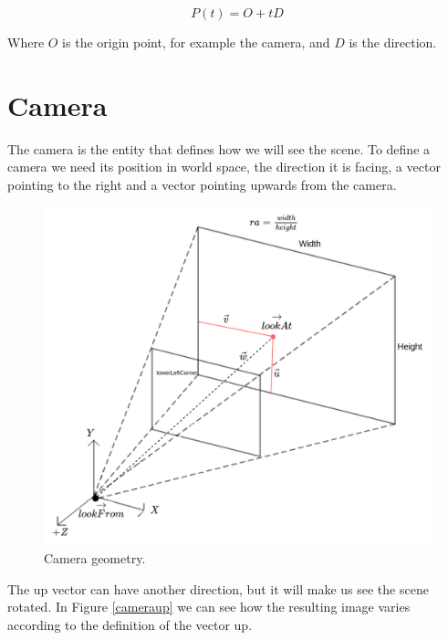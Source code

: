 \documentclass[titlepage,12pt]{report}
\begin{document}
\begin{equation} \label{rayeq}
P(t) = O + tD
\end{equation}

Where $O$ is the origin point, for example the camera, and $D$ is the direction.

\section{Camera}

The camera is the entity that defines how we will see the scene. To define a camera we need its position in world space, the direction it is facing, a vector pointing to the right and a vector pointing upwards from the camera. 

\begin{figure}[!ht]
	\centering
	\includegraphics[scale=0.35]{media/camera.png}
	\caption{Camera geometry.}
	\label{camegeom}
\end{figure}

The up vector can have another direction, but it will make us see the scene rotated. In Figure \ref{cameraup} we can see how the resulting image varies according to the definition of the vector up.
\end{document}
